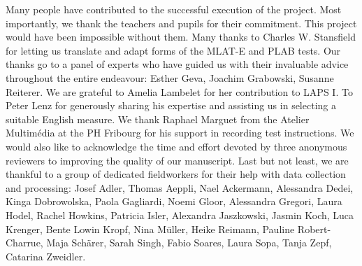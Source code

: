 \documentclass[output=paper]{langsci/langscibook}
\begin{document}
Many people have contributed to the successful execution of the project. Most importantly, we thank the teachers and pupils for their commitment. This project would have been impossible without them. Many thanks to Charles W. Stansfield for letting us translate and adapt forms of the MLAT-E and PLAB tests. Our thanks go to a panel of experts who have guided us with their invaluable advice throughout the entire endeavour: Esther Geva, Joachim Grabowski, Susanne Reiterer. We are grateful to Amelia Lambelet for her contribution to LAPS I. To Peter Lenz for generously sharing his expertise and assisting us in selecting a suitable English measure. We thank Raphael Marguet from the Atelier Multimédia at the PH Fribourg for his support in recording test instructions. We would also like to acknowledge the time and effort devoted by three anonymous reviewers to improving the quality of our manuscript. Last but not least, we are thankful to a group of dedicated fieldworkers for their help with data collection and processing: Josef Adler, Thomas Aeppli, Nael Ackermann, Alessandra Dedei, Kinga Dobrowolska, Paola Gagliardi, Noemi Gloor, Alessandra Gregori, Laura Hodel, Rachel Howkins, Patricia Isler, Alexandra Jaszkowski, Jasmin Koch, Luca Krenger, Bente Lowin Kropf, Nina Müller, Heike Reimann, Pauline Robert-Charrue, Maja Schärer, Sarah Singh, Fabio Soares, Laura Sopa, Tanja Zepf, Catarina Zweidler. 

{\sloppy\printbibliography[heading=subbibliography,notkeyword=this]}
\end{document}
